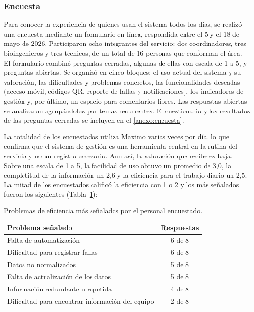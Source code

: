 \documentclass[10pt]{article}
\begin{document}
\subsubsection{Encuesta}
\label{sec:encuesta}

Para conocer la experiencia de quienes usan el sistema todos los días, se realizó una encuesta mediante un formulario en línea, respondida entre el 5 y el 18 de mayo de 2026. Participaron ocho integrantes del servicio: dos coordinadores, tres bioingenieros y tres técnicos, de un total de 16 personas que conforman el área. El formulario combinó preguntas cerradas, algunas de ellas con escala de 1 a 5, y preguntas abiertas. Se organizó en cinco bloques: el uso actual del sistema y su valoración, las dificultades y problemas concretos, las funcionalidades deseadas (acceso móvil, códigos QR, reporte de fallas y notificaciones), los indicadores de gestión y, por último, un espacio para comentarios libres. Las respuestas abiertas se analizaron agrupándolas por temas recurrentes. El cuestionario y los resultados de las preguntas cerradas se incluyen en el \ref{anexo:encuesta}.

La totalidad de los encuestados utiliza Maximo varias veces por día, lo que confirma que el sistema de gestión es una herramienta central en la rutina del servicio y no un registro accesorio. Aun así, la valoración que recibe es baja. Sobre una escala de 1 a 5, la facilidad de uso obtuvo un promedio de 3,0, la completitud de la información un 2,6 y la eficiencia para el trabajo diario un 2,5. La mitad de los encuestados calificó la eficiencia con 1 o 2 y los más señalados fueron los siguientes (Tabla~\ref{tab:problemas-eficiencia}):

\begin{table}[H]
    \caption{Problemas de eficiencia más señalados por el personal encuestado.}
    \label{tab:problemas-eficiencia}
    \centering
    \begin{tabular}{lc}
        \toprule
        \textbf{Problema señalado} & \textbf{Respuestas} \\
        \midrule
        Falta de automatización & 6 de 8 \\
        Dificultad para registrar fallas & 6 de 8 \\
        Datos no normalizados & 5 de 8 \\
        Falta de actualización de los datos & 5 de 8 \\
        Información redundante o repetida & 4 de 8 \\
        Dificultad para encontrar información del equipo & 2 de 8 \\
        \bottomrule
    \end{tabular}
\end{table}
\end{document}
